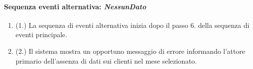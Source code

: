 \documentclass{article}
\begin{document}
		\paragraph{Sequenza eventi alternativa: \textit{NessunDato}}
	\begin{enumerate}	[leftmargin=28pt]
			\item  (1.) La sequenza di eventi alternativa inizia dopo il passo 6. della sequenza di eventi principale.
			\item  (2.) Il sistema mostra un opportuno messaggio di errore informando l'attore primario dell'assenza di dati sui clienti nel mese selezionato.
		\end{enumerate}
\end{document}
